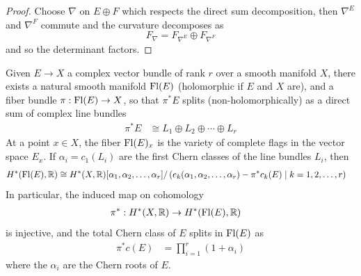 \documentclass[12pt]{article}
\begin{document}
\begin{proof}
    Choose $\nabla$ on $E \oplus F$ which respects the direct sum decomposition, then $\nabla^E$ and $\nabla^F$ commute and the curvature decomposes as \[
        F_\nabla = F_{\nabla^E} \oplus F_{\nabla^F}
    \] and so the determinant factors.
\end{proof}

\begin{proposition}
     Given $E \to X$ a complex vector bundle of rank $r$ over a smooth manifold $X$, there exists a natural smooth manifold $\operatorname{Fl}(E)$ (holomorphic if $E$ and $X$ are), and a fiber bundle $\pi: \operatorname{Fl}(E) \to X$, so that $\pi^* E$ splits (non-holomorphically) as a direct sum of complex line bundles \begin{align*}
        \pi^* E & \cong L_1 \oplus L_2 \oplus \cdots \oplus L_r
    \end{align*}
    At a point $x \in X$, the fiber $\operatorname{Fl}(E)_x$ is the variety of complete flags in the vector space $E_x$. If $\alpha_i = c_1(L_i)$ are the first Chern classes of the line bundles $L_i$, then \begin{align*}
        H^*(\operatorname{Fl}(E), \mathbb{R}) & \cong H^*(X, \mathbb{R})[\alpha_1, \alpha_2, \ldots, \alpha_r] / \left( e_k(\alpha_1, \alpha_2, \ldots, \alpha_r) - \pi^*c_k(E) \mid k = 1, 2, \ldots, r \right)
    \end{align*} In particular, the induced map on cohomology \begin{align*}
        \pi^*: H^*(X, \mathbb{R}) & \to H^*(\operatorname{Fl}(E), \mathbb{R})
    \end{align*} is injective, and the total Chern class of $E$ splits in $\operatorname{Fl}(E)$ as \begin{align*}
        \pi^* c(E) & = \prod_{i=1}^r (1 + \alpha_i)
    \end{align*} where the $\alpha_i$ are the Chern roots of $E$.
\end{proposition}
\end{document}
